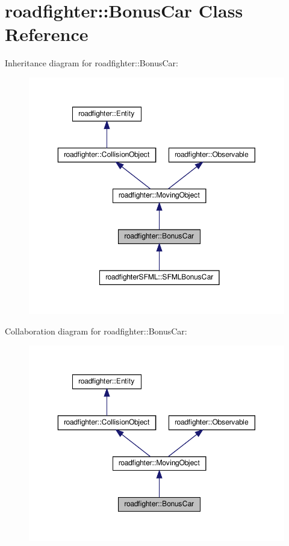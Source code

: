 \hypertarget{classroadfighter_1_1BonusCar}{}\section{roadfighter\+:\+:Bonus\+Car Class Reference}
\label{classroadfighter_1_1BonusCar}


Inheritance diagram for roadfighter\+:\+:Bonus\+Car\+:
\nopagebreak
\begin{figure}[H]
\begin{center}
\leavevmode
\includegraphics[width=350pt]{classroadfighter_1_1BonusCar__inherit__graph}
\end{center}
\end{figure}


Collaboration diagram for roadfighter\+:\+:Bonus\+Car\+:
\nopagebreak
\begin{figure}[H]
\begin{center}
\leavevmode
\includegraphics[width=350pt]{classroadfighter_1_1BonusCar__coll__graph}
\end{center}
\end{figure}
